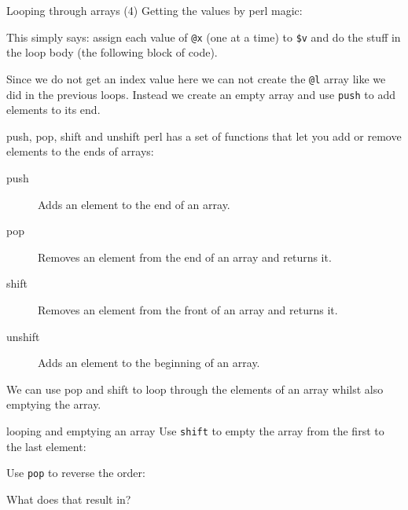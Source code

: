 \documentclass[pdf]{beamer}
\begin{document}
\begin{frame}[fragile]{Looping through arrays (4)}
  Getting the values by perl magic:
  
  
  This simply says: assign each value of \verb|@x| (one at a time) to
  \verb|$v| and do the stuff in the loop body (the following block of code).

  Since we do not get an index value here we can not create the \verb|@l|
  array like we did in the previous loops. Instead we create an empty array
  and use \verb|push| to add elements to its end.
\end{frame}

\begin{frame}[fragile]{push, pop, shift and unshift}
  perl has a set of functions that let you add or remove elements to the ends
  of arrays:
  \begin{description}
    \item[push] Adds an element to the end of an array.
    \item[pop] Removes an element from the end of an array and returns it.
    \item[shift] Removes an element from the front of an array and returns it.
    \item[unshift] Adds an element to the beginning of an array.
  \end{description}

  We can use pop and shift to loop through the elements of an array whilst
  also emptying the array.
\end{frame}

\begin{frame}[fragile]{looping and emptying an array}
  Use \texttt{shift} to empty the array from the first to the last element:
  
  Use \texttt{pop} to reverse the order:

  What does that result in?
\end{frame}
\end{document}
